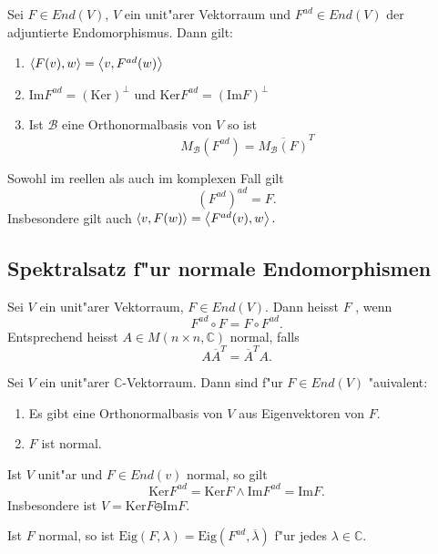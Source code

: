 \documentclass[11pt, a4paper]{article}
\begin{document}
\begin{theorem}
Sei $F \in End(V)$, $V$ ein unit"arer Vektorraum und $F^{ad} \in End(V)$ der adjuntierte Endomorphismus. Dann gilt:
\begin{enumerate}
\item $\left\langle {F(v)} , {w} \right\rangle = \left\langle {v} , {F^{ad}(w)} \right\rangle$
\item $\mathrm{Im}F^{ad} = (\mathrm{Ker})^\perp$ und $\mathrm{Ker}F^{ad} = (\mathrm{Im}F)^\perp$
\item Ist $\mathcal{B}$ eine Orthonormalbasis von $V$ so ist
$$
M_{\mathcal{B}}(F^{ad}) = \overline{M_\mathcal{B}(F)}^T
$$  
\end{enumerate}
\end{theorem}

\begin{remark}
Sowohl im reellen als auch im komplexen Fall gilt 
$$
(F^{ad})^{ad} = F.
$$
Insbesondere gilt auch $\left\langle {v} , {F(w)} \right\rangle = \left\langle {F^{ad}(v)} , {w} \right\rangle.$
\end{remark}


\subsection{Spektralsatz f"ur normale Endomorphismen}

\begin{definition}
Sei $V$ ein unit"arer Vektorraum, $F \in End(V)$. Dann heisst $F$ , wenn 
$$
F^{ad}\circ F = F \circ F^{ad}.
$$
Entsprechend heisst $A \in M(n \times n, \mathbb{C})$ normal, falls
$$
A \overline{A}^T = \overline{A}^T A.
$$
\end{definition}

\begin{theorem}
Sei $V$ ein unit"arer $\mathbb{C}$-Vektorraum. Dann sind f"ur $F \in End(V)$ "auivalent:
\begin{enumerate}
\item Es gibt eine Orthonormalbasis von $V$ aus Eigenvektoren von $F$.
\item $F$ ist normal.
\end{enumerate}
\end{theorem}

\begin{theorem}
Ist $V$ unit"ar und $F \in End(v)$ normal, so gilt
$$
\mathrm{Ker}F^{ad} = \mathrm{Ker}F \land \mathrm{Im}F^{ad} = \mathrm{Im}F.
$$
Insbesondere ist $V = \mathrm{Ker}F \obot \mathrm{Im}F$.
\end{theorem}

\begin{corollary}
Ist $F$ normal, so ist $\mathrm{Eig}(F, \lambda) = \mathrm{Eig}(F^{ad}, \overline{\lambda})$ f"ur jedes $\lambda \in \mathbb{C}$.
\end{corollary}
\end{document}
